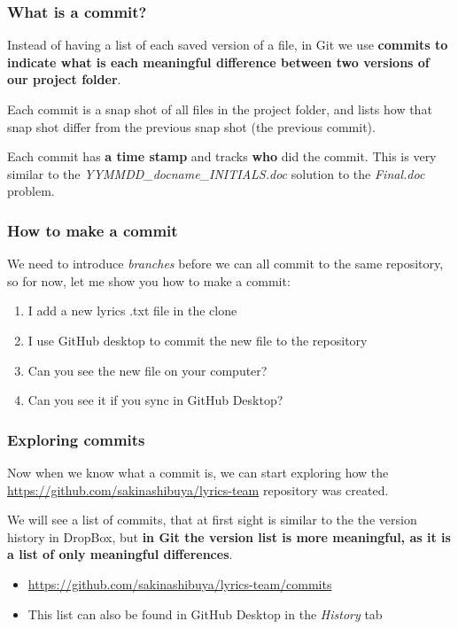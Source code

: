 \documentclass[aspectratio=169]{beamer} %
\newcommand{\trainingURL}[1]{{\color{blue}\url{#1}}}
\newcommand{\traininerUsername}{sakinashibuya}
\newcommand{\repoName}{\traininerUsername/lyrics-team}
\newcommand{\trainingRepoURL}[1]{\trainingURL{https://github.com/\repoName #1}}
\begin{document}
\begin{frame}
\frametitle{What is a commit?}

	Instead of having a list of each saved version of a file, in Git we use \textbf{commits to indicate what is each meaningful difference between two versions of our project folder}.

	\vspace{.25cm}

	Each commit is a snap shot of all files in the project folder, and lists how that snap shot differ from the previous snap shot (the previous commit).

	\vspace{.25cm}

	Each commit has \textbf{a time stamp} and tracks \textbf{who} did the commit. This is very similar to the \textit{YYMMDD\_docname\_INITIALS.doc} solution to the \textit{Final.doc} problem.

\end{frame}

\begin{frame}
\frametitle{How to make a commit}

	We need to introduce \textit{branches} before we can all commit to the same repository, so for now, let me show you how to make a commit:

	\begin{enumerate}
		\item I add a new lyrics .txt file in the clone
		\item I use GitHub desktop to commit the new file to the repository
		\item Can you see the new file on your computer?
		\item Can you see it if you sync in GitHub Desktop?
	\end{enumerate}

\end{frame}


\begin{frame}
\frametitle{Exploring commits}

	Now when we know what a commit is, we can start exploring how the \trainingRepoURL{} repository was created.

	\vspace{.25cm}

	We will see a list of commits, that at first sight is similar to the the version history in DropBox, but \textbf{in Git the version list is more meaningful, as it is a list of only meaningful differences}.

	\vspace{.25cm}

	\begin{itemize}
		\item \trainingRepoURL{/commits}
		\item This list can also be found in GitHub Desktop in the \textit{History} tab
	\end{itemize}

\end{frame}
\end{document}

